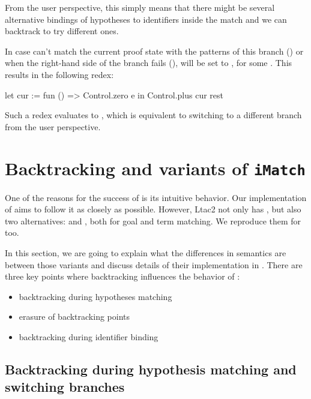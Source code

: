 From the user perspective, this simply means that there might be several alternative bindings of hypotheses to identifiers inside the match and we can backtrack to try different ones.

In case  can't match the current proof state with the patterns of this branch () or when the right-hand side of the branch fails (),  will be set to , for some .
This results in the following redex:
\begin{coq}
let cur := fun () => Control.zero e
in Control.plus cur rest
\end{coq}
Such a redex evaluates to , which is equivalent to switching to a different branch from the user perspective.

\section{Backtracking and variants of \texttt{iMatch}}

One of the reasons for the success of  is its intuitive behavior.
Our implementation of  aims to follow it as closely as possible.
However, Ltac2 not only has , but also two alternatives:  and , both for goal and term matching.
We reproduce them for  too.

In this section, we are going to explain what the differences in semantics are between those variants and discuss details of their implementation in .
There are three key points where backtracking influences the behavior of :

\begin{minipage}{1.0\linewidth}
\begin{itemize}
\item backtracking during hypotheses matching
\item erasure of backtracking points
\item backtracking during identifier binding
\end{itemize}
\end{minipage}

\subsection{Backtracking during hypothesis matching and switching branches}

